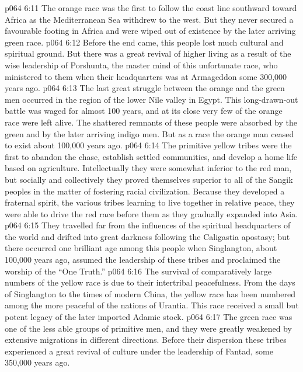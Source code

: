 \vs p064 6:11 The orange race was the first to follow the coast line southward toward Africa as the Mediterranean Sea withdrew to the west. But they never secured a favourable footing in Africa and were wiped out of existence by the later arriving green race.
\vs p064 6:12 Before the end came, this people lost much cultural and spiritual ground. But there was a great revival of higher living as a result of the wise leadership of Porshunta, the master mind of this unfortunate race, who ministered to them when their headquarters was at Armageddon some 300,000 years ago.
\vs p064 6:13 The last great struggle between the orange and the green men occurred in the region of the lower Nile valley in Egypt. This long\hyp{}drawn\hyp{}out battle was waged for almost 100 years, and at its close very few of the orange race were left alive. The shattered remnants of these people were absorbed by the green and by the later arriving indigo men. But as a race the orange man ceased to exist about 100,000 years ago.
\vs p064 6:14 \bibnobreakspace {} The primitive yellow tribes were the first to abandon the chase, establish settled communities, and develop a home life based on agriculture. Intellectually they were somewhat inferior to the red man, but socially and collectively they proved themselves superior to all of the Sangik peoples in the matter of fostering racial civilization. Because they developed a fraternal spirit, the various tribes learning to live together in relative peace, they were able to drive the red race before them as they gradually expanded into Asia.
\vs p064 6:15 They travelled far from the influences of the spiritual headquarters of the world and drifted into great darkness following the Caligastia apostasy; but there occurred one brilliant age among this people when Singlangton, about 100,000 years ago, assumed the leadership of these tribes and proclaimed the worship of the “One Truth.”
\vs p064 6:16 The survival of comparatively large numbers of the yellow race is due to their intertribal peacefulness. From the days of Singlangton to the times of modern China, the yellow race has been numbered among the more peaceful of the nations of Urantia. This race received a small but potent legacy of the later imported Adamic stock.
\vs p064 6:17 \bibnobreakspace {} The green race was one of the less able groups of primitive men, and they were greatly weakened by extensive migrations in different directions. Before their dispersion these tribes experienced a great revival of culture under the leadership of Fantad, some 350,000 years ago.
